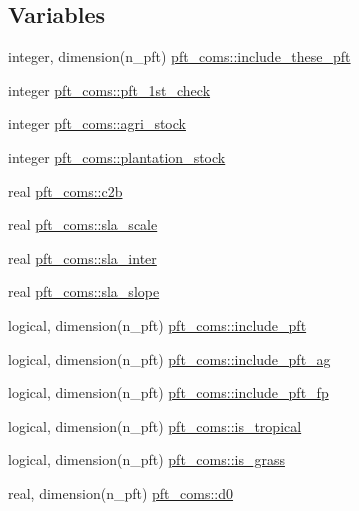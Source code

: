 \subsection*{Variables}
\begin{DoxyCompactItemize}
\item 
integer, dimension(n\+\_\+pft) \hyperlink{namespacepft__coms_a7ab2f215846d8f15e70deeb77fa8802e}{pft\+\_\+coms\+::include\+\_\+these\+\_\+pft}
\item 
integer \hyperlink{namespacepft__coms_a46f15da0b9bf81a4f8bdba850efff1c8}{pft\+\_\+coms\+::pft\+\_\+1st\+\_\+check}
\item 
integer \hyperlink{namespacepft__coms_afa924efff5f6897a77ef72109bfb8811}{pft\+\_\+coms\+::agri\+\_\+stock}
\item 
integer \hyperlink{namespacepft__coms_abade08057c8846615ec5ff4ff9d3ffa2}{pft\+\_\+coms\+::plantation\+\_\+stock}
\item 
real \hyperlink{namespacepft__coms_a2613e7dd1fa05af83d058d81f92946ec}{pft\+\_\+coms\+::c2b}
\item 
real \hyperlink{namespacepft__coms_a1ba9e47e49347dca3d82a5d2a694136d}{pft\+\_\+coms\+::sla\+\_\+scale}
\item 
real \hyperlink{namespacepft__coms_a7f2175fb500b1a4a0558108744ef6da8}{pft\+\_\+coms\+::sla\+\_\+inter}
\item 
real \hyperlink{namespacepft__coms_abac97f719f7239eac0e2ad92dc9a8bef}{pft\+\_\+coms\+::sla\+\_\+slope}
\item 
logical, dimension(n\+\_\+pft) \hyperlink{namespacepft__coms_a01416a40237dfc9b75e2205ff91ef2be}{pft\+\_\+coms\+::include\+\_\+pft}
\item 
logical, dimension(n\+\_\+pft) \hyperlink{namespacepft__coms_a39d76f589c044b393db74ff7392193c7}{pft\+\_\+coms\+::include\+\_\+pft\+\_\+ag}
\item 
logical, dimension(n\+\_\+pft) \hyperlink{namespacepft__coms_adc76e53cf81aef56357b589214fd3700}{pft\+\_\+coms\+::include\+\_\+pft\+\_\+fp}
\item 
logical, dimension(n\+\_\+pft) \hyperlink{namespacepft__coms_ae26d357a418f5441d136c81e335cd633}{pft\+\_\+coms\+::is\+\_\+tropical}
\item 
logical, dimension(n\+\_\+pft) \hyperlink{namespacepft__coms_a74313e4ba2eb3134ae662a573ee862e4}{pft\+\_\+coms\+::is\+\_\+grass}
\item 
real, dimension(n\+\_\+pft) \hyperlink{namespacepft__coms_aafd962aec98e7e8c1cfefd6543409bd5}{pft\+\_\+coms\+::d0}
\item 

\end{DoxyCompactItemize}

